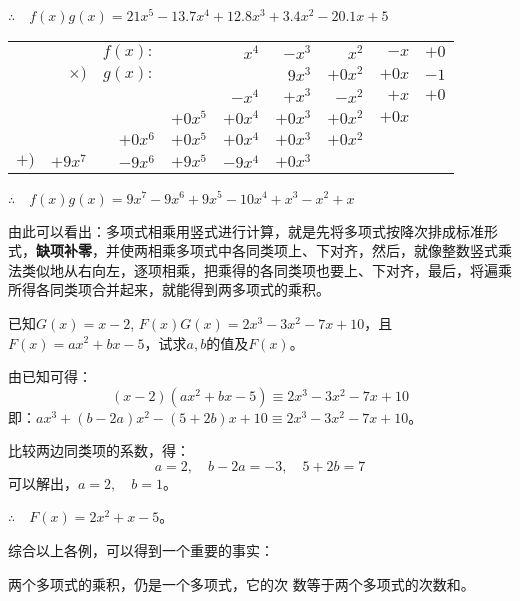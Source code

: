         $\therefore\quad f(x)g(x)=21x^5-13.7x^4+12.8x^3+3.4x^2-20.1x+5$

\begin{center}
    \begin{tabular}{rrrrrrrrr}
      &        &    $f(x):$    &        &    $x^4$    &    $-x^3$    &    $x^2$    &    $-x$    &    $+0$\\
&    $\times)$    &    $g(x):$    &        &        &    $9x^3$    &    $+0x^2$    &    $+0x$    &    $-1$\\
\hline
&        &        &        &    $-x^4$    &    $+x^3$    &    $-x^2$    &    $+x$    &    $+0$\\
&        &        &    $+0x^5$    &    $+0x^4$    &    $+0x^3$    &    $+0x^2$    &    $+0x$    &    \\
&        &    $+0x^6$    &    $+0x^5$    &    $+0x^4$    &    $+0x^3$    &    $+0x^2$    &        &    \\
$+)$    &    $+9x^7$    &    $-9x^6$    &    $+9x^5$    &    $-9x^4$    &    $+0x^3$    &        &        &    \\
\hline
\end{tabular}
\end{center} 

        $\therefore\quad f(x)g(x)=9x^7-9x^6+9x^5-10x^4+x^3-x^2+x$

由此可以看出：多项式相乘用竖式进行计算，就是先将多项式按降次排成标准形式，\textbf{缺项补零}，并使两相乘多项式中各同类项上、下对齐，然后，就像整数竖式乘法类似地从右向左，逐项相乘，把乘得的各同类项也要上、下对齐，最后，将遍乘所得各同类项合并起来，就能得到两多项式的乘积。

\begin{example}
    已知$G(x)=x-2$, $F(x)G(x)=2x^3-3x^2-7x+10$，且$F(x)=ax^2+bx-5$，试求$a,b$的值及$F(x)$。
\end{example}

\begin{solution}
    由已知可得：
    \[(x-2)(ax^2+bx-5)\equiv 2x^3-3x^2-7x+10 \]
    即：$ax^3+(b-2a)x^2-(5+2b)x+10\equiv 2x^3-3x^2-7x+10$。

    比较两边同类项的系数，得：
    \[a=2,\quad b-2a=-3,\quad 5+2b=7 \]
    可以解出，$a=2,\quad b=1$。

    $\therefore\quad F(x)=2x^2+x-5$。
\end{solution}

综合以上各例，可以得到一个重要的事实：
\begin{blk}{}
    两个多项式的乘积，仍是一个多项式，它的次
数等于两个多项式的次数和。
\end{blk}

